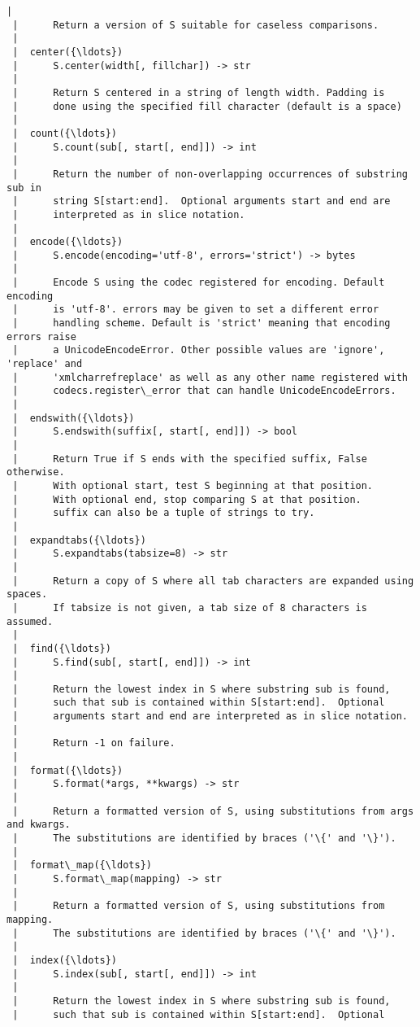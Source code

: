 \begin{Verbatim}[commandchars=\\\{\}]
 |      
 |      Return a version of S suitable for caseless comparisons.
 |  
 |  center({\ldots})
 |      S.center(width[, fillchar]) -> str
 |      
 |      Return S centered in a string of length width. Padding is
 |      done using the specified fill character (default is a space)
 |  
 |  count({\ldots})
 |      S.count(sub[, start[, end]]) -> int
 |      
 |      Return the number of non-overlapping occurrences of substring sub in
 |      string S[start:end].  Optional arguments start and end are
 |      interpreted as in slice notation.
 |  
 |  encode({\ldots})
 |      S.encode(encoding='utf-8', errors='strict') -> bytes
 |      
 |      Encode S using the codec registered for encoding. Default encoding
 |      is 'utf-8'. errors may be given to set a different error
 |      handling scheme. Default is 'strict' meaning that encoding errors raise
 |      a UnicodeEncodeError. Other possible values are 'ignore', 'replace' and
 |      'xmlcharrefreplace' as well as any other name registered with
 |      codecs.register\_error that can handle UnicodeEncodeErrors.
 |  
 |  endswith({\ldots})
 |      S.endswith(suffix[, start[, end]]) -> bool
 |      
 |      Return True if S ends with the specified suffix, False otherwise.
 |      With optional start, test S beginning at that position.
 |      With optional end, stop comparing S at that position.
 |      suffix can also be a tuple of strings to try.
 |  
 |  expandtabs({\ldots})
 |      S.expandtabs(tabsize=8) -> str
 |      
 |      Return a copy of S where all tab characters are expanded using spaces.
 |      If tabsize is not given, a tab size of 8 characters is assumed.
 |  
 |  find({\ldots})
 |      S.find(sub[, start[, end]]) -> int
 |      
 |      Return the lowest index in S where substring sub is found,
 |      such that sub is contained within S[start:end].  Optional
 |      arguments start and end are interpreted as in slice notation.
 |      
 |      Return -1 on failure.
 |  
 |  format({\ldots})
 |      S.format(*args, **kwargs) -> str
 |      
 |      Return a formatted version of S, using substitutions from args and kwargs.
 |      The substitutions are identified by braces ('\{' and '\}').
 |  
 |  format\_map({\ldots})
 |      S.format\_map(mapping) -> str
 |      
 |      Return a formatted version of S, using substitutions from mapping.
 |      The substitutions are identified by braces ('\{' and '\}').
 |  
 |  index({\ldots})
 |      S.index(sub[, start[, end]]) -> int
 |      
 |      Return the lowest index in S where substring sub is found, 
 |      such that sub is contained within S[start:end].  Optional

\end{Verbatim}
